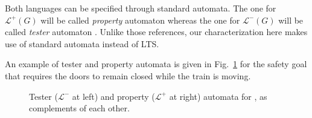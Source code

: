 Both languages can be specified through standard automata. The one for $\mathcal{L}^{+}(G)$ will be called \emph{property} automaton \cite{Letier:2005} whereas the one for $\mathcal{L}^{-}(G)$ will be called \emph{tester} automaton \cite{Giannakopoulou:2003}. Unlike those references, our characterization here makes use of standard automata instead of LTS.

An example of tester and property automata is given in Fig.~\ref{image:tester-and-property-automata} for the safety goal that requires the doors to remain closed while the train is moving.
\begin{figure}\centering
{}
\caption[Tester and property automata, as complements of each other.]{Tester ($\mathcal{L}^{-}$ at left) and property ($\mathcal{L}^{+}$ at right) automata for , as complements of each other.\label{image:tester-and-property-automata}}
\end{figure}

